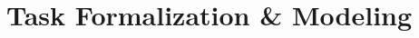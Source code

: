 \section{Task Formalization \& Modeling}

\begin{comment}
* Define the task
- Some math
- Several different application domains
    - augmentation
    - adversarial attack
    - extend data
    - counterfactual explanation
- Importance of where to change and how to change

* How to train
- Compute control tags
- Special tokens

* Use existing datasets
- Why each dataset 
- Data distribution [maybe appendix]

* Training hyperparameters

* Evaluations
- Filtering
- Diversity
\end{comment}

